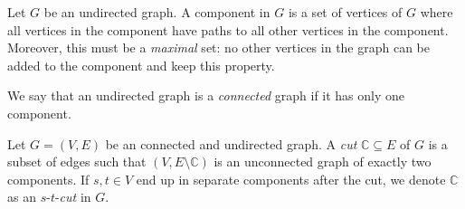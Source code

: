 \begin{definition}
    Let $G$ be an undirected graph. A component in $G$ is a set of vertices of $G$ where all vertices in the component have paths to all other vertices in the component. Moreover, this must be a \emph{maximal} set: no other vertices in the graph can be added to the component and keep this property.
\end{definition}

\begin{definition}
    We say that an undirected graph is a \emph{connected} graph if it has only one component.
\end{definition}

\begin{definition}[Cut]
    Let $G = (V, E)$ be an connected and undirected graph. A \emph{cut} $\mathbb{C} \subseteq E$ of $G$ is a subset of edges such that $(V, E \setminus \mathbb{C})$ is an unconnected graph of exactly two components. If $s,t \in V$ end up in separate components after the cut, we denote $\mathbb{C}$ as an $s$-$t$-\emph{cut} in $G$.
\end{definition}